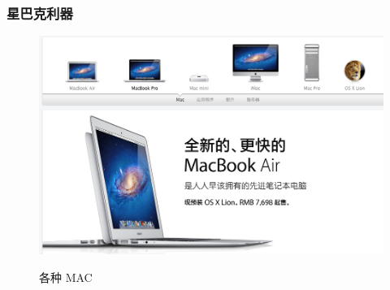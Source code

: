 \documentclass[utf8x, notes=hide]{beamer}
\begin{document}
\begin{frame}
  \frametitle{星巴克利器}
  \begin{figure}
    \centering
    \includegraphics[bb=0 0 964 611,scale=.2]{images/mac.png}
    \label{fig:mac}
    \caption{各种 MAC}
    \label{fig:Mac}
  \end{figure}
\end{frame}
\end{document}

